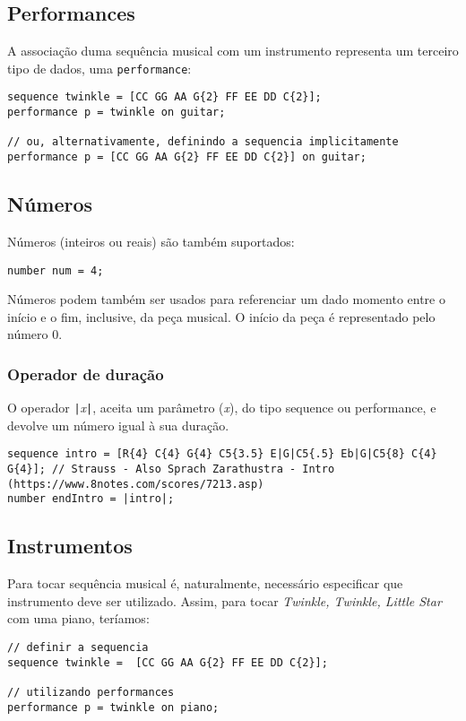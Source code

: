\documentclass{article}
\begin{document}
\subsection{Performances}
A associação duma sequência musical com um instrumento representa um terceiro tipo de dados, uma \texttt{performance}:
\begin{lstlisting} 
sequence twinkle = [CC GG AA G{2} FF EE DD C{2}];
performance p = twinkle on guitar;

// ou, alternativamente, definindo a sequencia implicitamente
performance p = [CC GG AA G{2} FF EE DD C{2}] on guitar;
\end{lstlisting}

\subsection{Números}
Números (inteiros ou reais) são também suportados:
\begin{lstlisting} 
number num = 4;
\end{lstlisting}
Números podem também ser usados para referenciar um dado momento entre o início e o fim, inclusive, da peça musical. O início da peça é representado pelo número 0. 
\subsubsection{Operador de duração}
O operador \texttt{|}\textit{x}\texttt{|}, aceita um parâmetro (\textit{x}), do tipo sequence ou performance, e devolve um número igual à sua duração.
\begin{lstlisting} 
sequence intro = [R{4} C{4} G{4} C5{3.5} E|G|C5{.5} Eb|G|C5{8} C{4} G{4}]; // Strauss - Also Sprach Zarathustra - Intro (https://www.8notes.com/scores/7213.asp)
number endIntro = |intro|;
\end{lstlisting}

\subsection{Instrumentos}
Para tocar sequência musical é, naturalmente, necessário especificar que instrumento deve ser utilizado. Assim, para tocar \textit{Twinkle, Twinkle, Little Star} com uma piano, teríamos:
\begin{lstlisting} 
// definir a sequencia
sequence twinkle =  [CC GG AA G{2} FF EE DD C{2}];

// utilizando performances
performance p = twinkle on piano;
\end{lstlisting}
\end{document}
